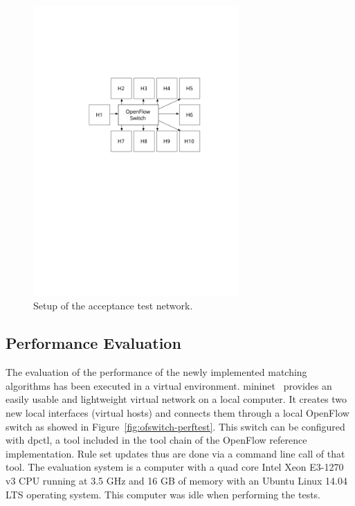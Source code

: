 \documentclass[a4paper,
		12pt,
		parskip=full,
		titlepage
		]{scrartcl}
\begin{document}
\begin{figure}
\centering
\includegraphics[width=0.7\textwidth]{images/ofswitch-acctest}
\caption{Setup of the acceptance test network.}
\label{fig:ofswitch-acctest}
\end{figure}


\subsection{Performance Evaluation}
The evaluation of the performance of the newly implemented matching algorithms has been executed in a virtual environment.
\textsf{mininet}~\cite{mininet} provides an easily usable and lightweight virtual network on a local computer.
It creates two new local interfaces (virtual hosts) and connects them through 
a local OpenFlow switch as showed in Figure~\ref{fig:ofswitch-perftest}.
This switch can be configured with \textsf{dpctl}, a tool included in the tool chain of the OpenFlow reference implementation.
Rule set updates thus are done via a command line call of that tool.
The evaluation system is a computer with a quad core Intel Xeon E3-1270 v3 CPU 
running at 3.5 GHz and 16 GB of memory with an Ubuntu Linux 14.04 LTS operating system.
This computer was idle when performing the tests.
\end{document}
